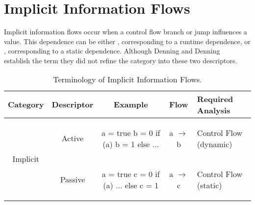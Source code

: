 \section{Implicit Information Flows}
\label{sec:implicit-flow}

Implicit information flows occur when a control flow branch or jump influences a value.
This dependence can be either , corresponding to a runtime dependence, or , corresponding to a static dependence.
Although Denning and Denning~\cite{denning.denning+77} establish the term  they did not refine the category into these two descriptors.

\begin{table*}[h]
\centering
\begin{tabular}{ccccm{2.5cm}}
\toprule
Category & Descriptor & Example & Flow & Required Analysis \\
\midrule[\heavyrulewidth]
\multirow{7}{*}{Implicit} & Active &
\begin{js-embed}
a = true
b = 0
if (a)
   b = 1
else
   ...
\end{js-embed}
& a $\rightarrow$ b & Control Flow (dynamic)\\
\cmidrule(r){2-5} & Passive &
\begin{js-embed}
a = true
c = 0
if (a)
   ...
else
   c = 1
\end{js-embed}
& a $\rightarrow$ c & Control Flow (static)\\
\bottomrule
\end{tabular}
\caption{Terminology of Implicit Information Flows.}
\label{table:implicitterminology}
\end{table*}

